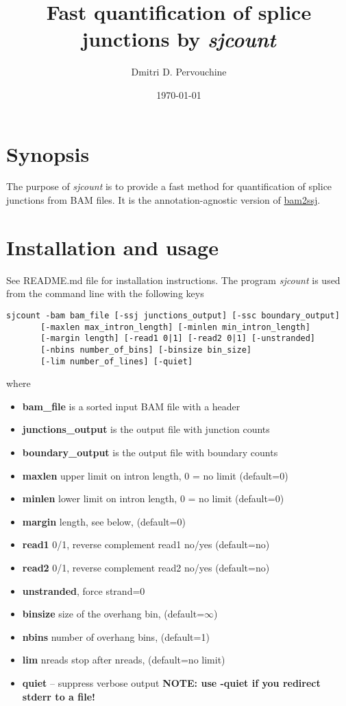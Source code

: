 \documentclass{article}
\begin{document}
\title{Fast quantification of splice junctions by {\em sjcount}}
\author{Dmitri D. Pervouchine}
\date{\today}
\maketitle

\section{Synopsis}

The purpose of {\em sjcount} is to provide a fast method for quantification of splice junctions from BAM files. It is the annotation-agnostic version of 
\href{https://github.com/pervouchine/bam2ssj}{bam2ssj}.


\section{Installation and usage}

See README.md file for installation instructions. The program {\em sjcount} is used from the command line with the following keys

\begin{verbatim}
sjcount -bam bam_file [-ssj junctions_output] [-ssc boundary_output]
       [-maxlen max_intron_length] [-minlen min_intron_length] 
       [-margin length] [-read1 0|1] [-read2 0|1] [-unstranded] 
       [-nbins number_of_bins] [-binsize bin_size] 
       [-lim number_of_lines] [-quiet]
\end{verbatim}
where
\begin{itemize}
\item {\bf bam\_file} is a sorted input BAM file with a header
\item {\bf junctions\_output} is the output file with junction counts
\item {\bf boundary\_output} is the output file with boundary counts
\item {\bf maxlen} upper limit on intron length, 0 = no limit (default=0)
\item {\bf minlen} lower limit on intron length, 0 = no limit (default=0)
\item {\bf margin} length, see below, (default=0)
\item {\bf read1} 0/1, reverse complement read1 no/yes (default=no)
\item {\bf read2} 0/1, reverse complement read2 no/yes (default=no)
\item {\bf unstranded}, force strand=0
\item {\bf binsize} size of the overhang bin, (default=$\infty$)
\item {\bf nbins} number of overhang bins, (default=1)
\item {\bf lim} nreads stop after nreads, (default=no limit)
\item {\bf quiet} -- suppress verbose output {\bf NOTE: use -quiet if you redirect stderr to a file!}
\end{itemize}
\end{document}
